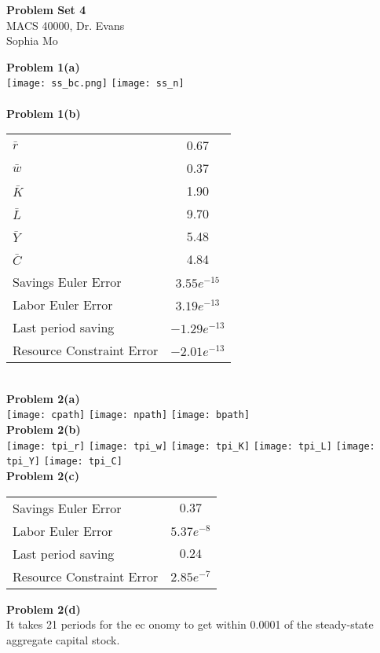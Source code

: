 \documentclass[letterpaper,12pt]{article}
\theoremstyle{definition}
\begin{document}
\begin{flushleft}
  \textbf{\large{Problem Set 4}} \\
  MACS 40000, Dr. Evans \\
  Sophia Mo
\end{flushleft}

\vspace{5mm}

\noindent\textbf{Problem 1(a)}\\
\texttt{[image: ss\_bc.png]}
\texttt{[image: ss\_n]}\\
\\
\noindent\textbf{Problem 1(b)}\\
\begin{table}[htbp!]\centering
\begin{tabular}{|l|c|}\hline
 $\bar{r}$ & 0.67\\
 $\bar{w}$ & 0.37\\
 $\bar{K}$ & 1.90\\
 $\bar{L}$ &9.70\\
 $\bar{Y}$ &5.48\\
 $\bar{C}$ &4.84\\
 Savings Euler Error & $3.55e^{-15}$\\
 Labor Euler Error & $3.19e^{-13}$\\
 Last period saving & $-1.29e^{-13}$\\
 Resource Constraint Error & $-2.01e^{-13}$\\ \hline
\end{tabular}
\end{table}
\\
\noindent\textbf{Problem 2(a)}\\
\texttt{[image: cpath]}
\texttt{[image: npath]}
\texttt{[image: bpath]}
\\
\noindent\textbf{Problem 2(b)}\\
\texttt{[image: tpi\_r]}
\texttt{[image: tpi\_w]}
\texttt{[image: tpi\_K]}
\texttt{[image: tpi\_L]}
\texttt{[image: tpi\_Y]}
\texttt{[image: tpi\_C]}
\\
\noindent\textbf{Problem 2(c)}\\
\begin{table}[htbp!]\centering
\begin{tabular}{|l|c|}\hline
 Savings Euler Error & $0.37$\\
 Labor Euler Error & $5.37e^{-8}$\\
 Last period saving & $0.24$\\
 Resource Constraint Error & $2.85e^{-7}$\\ \hline
\end{tabular}
\end{table}

\noindent\textbf{Problem 2(d)}\\
It takes 21 periods for the ec onomy to get within 0.0001 of the steady-state aggregate capital stock.
\end{document}
